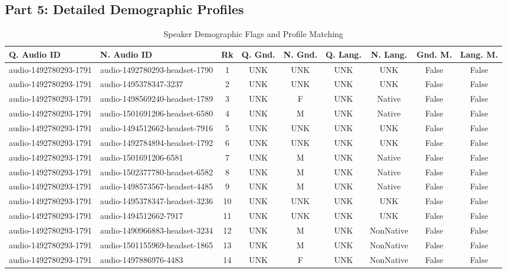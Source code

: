 \subsection*{Part 5: Detailed Demographic Profiles}
{\small
\begin{longtable}{p{2.1cm} p{2.1cm} c cccc cc}
\caption{Speaker Demographic Flags and Profile Matching} \\
\toprule
\textbf{Q. Audio ID} & \textbf{N. Audio ID} & \textbf{Rk} & \textbf{Q. Gnd.} & \textbf{N. Gnd.} & \textbf{Q. Lang.} & \textbf{N. Lang.} & \textbf{Gnd. M.} & \textbf{Lang. M.} \\
\midrule
audio-1492780293-1791 & audio-1492780293-headset-1790 & 1 & UNK & UNK & UNK & UNK & False & False \\
audio-1492780293-1791 & audio-1495378347-3237 & 2 & UNK & UNK & UNK & UNK & False & False \\
audio-1492780293-1791 & audio-1498569240-headset-1789 & 3 & UNK & F & UNK & Native & False & False \\
audio-1492780293-1791 & audio-1501691206-headset-6580 & 4 & UNK & M & UNK & Native & False & False \\
audio-1492780293-1791 & audio-1494512662-headset-7916 & 5 & UNK & UNK & UNK & UNK & False & False \\
audio-1492780293-1791 & audio-1492784894-headset-1792 & 6 & UNK & UNK & UNK & UNK & False & False \\
audio-1492780293-1791 & audio-1501691206-6581 & 7 & UNK & M & UNK & Native & False & False \\
audio-1492780293-1791 & audio-1502377780-headset-6582 & 8 & UNK & M & UNK & Native & False & False \\
audio-1492780293-1791 & audio-1498573567-headset-4485 & 9 & UNK & M & UNK & Native & False & False \\
audio-1492780293-1791 & audio-1495378347-headset-3236 & 10 & UNK & UNK & UNK & UNK & False & False \\
audio-1492780293-1791 & audio-1494512662-7917 & 11 & UNK & UNK & UNK & UNK & False & False \\
audio-1492780293-1791 & audio-1490966883-headset-3234 & 12 & UNK & M & UNK & NonNative & False & False \\
audio-1492780293-1791 & audio-1501155969-headset-1865 & 13 & UNK & M & UNK & NonNative & False & False \\
audio-1492780293-1791 & audio-1497886976-4483 & 14 & UNK & F & UNK & NonNative & False & False \\

\end{longtable}}
